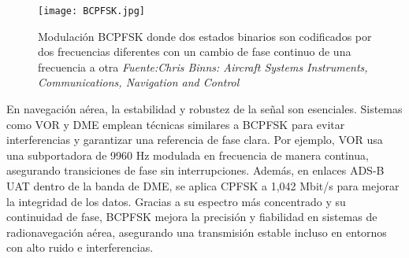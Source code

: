  \begin{figure}[H]
    \centering
    \texttt{[image: BCPFSK.jpg]}
    \caption{\centering Modulación BCPFSK donde dos estados binarios son codificados por dos frecuencias diferentes con un cambio de fase continuo de una frecuencia a otra\textit{ Fuente:Chris Binns: Aircraft Systems Instruments, Communications, Navigation and Control}}
    \label{fig:bcpfsk}
\end{figure}

En navegación aérea, la estabilidad y robustez de la señal son esenciales. Sistemas como VOR y DME emplean técnicas similares a BCPFSK para evitar interferencias y garantizar una referencia de fase clara. Por ejemplo, VOR usa una subportadora de 9960 Hz modulada en frecuencia de manera continua, asegurando transiciones de fase sin interrupciones. Además, en enlaces ADS-B UAT dentro de la banda de DME, se aplica CPFSK a 1,042 Mbit/s para mejorar la integridad de los datos. Gracias a su espectro más concentrado y su continuidad de fase, BCPFSK mejora la precisión y fiabilidad en sistemas de radionavegación aérea, asegurando una transmisión estable incluso en entornos con alto ruido e interferencias.\\
